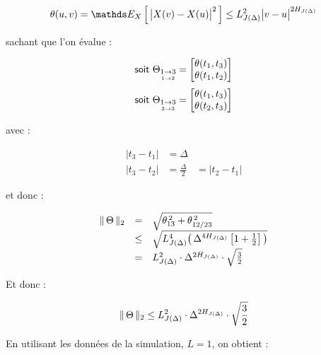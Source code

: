 \begin{equation}
	\theta(u,v) = \esperanceloi X { \bigl| X(v) - X(u) \bigr|^2 } \leq L_{J(\Delta)}^2 \bigl| v - u \bigr|^{2 H_{J(\Delta)}}
\end{equation}

sachant que l'on évalue :

\begin{equation}
	\textsf{soit }
	\Theta_{\underset{1 \rightarrow 2}{1 \rightarrow 3}} = \begin{bmatrix} \theta(t_1, t_3) \\ \theta(t_1, t_2) \end{bmatrix}
\end{equation}
\begin{equation}
	\textsf{soit }
	\Theta_{\underset{2 \rightarrow 3}{1 \rightarrow 3}} = \begin{bmatrix} \theta(t_1, t_3) \\ \theta(t_2, t_3) \end{bmatrix}
\end{equation}


avec :

\begin{equation}
	\begin{array}{ccc}
		|t_3 - t_1| & = \Delta
		\\
		|t_3 - t_2| & = \frac \Delta 2 & = |t_2 - t_1|
	\end{array}
\end{equation}

et donc :

\begin{equation}
	\displaystyle
	\begin{array}{rclr}
		\lVert \, \Theta \, \rVert _ {2} & =    & \sqrt{\theta_{13}^{\,2} + \theta_{12/23}^{\, 2}}
		\\
		                & \leq & \sqrt{ L_{J(\Delta)}^4 \bigl( \, \Delta^{4 H_{J(\Delta)}} \left[ 1 + \frac 1 2 \right]  \, \bigr) }
		\\
		                & =    & L_{J(\Delta)}^2 \cdot \Delta^{2H_{J(\Delta)}} \cdot \sqrt{\frac 3 2}
	\end{array}
\end{equation}

Et donc :

\begin{equation*}
	\lVert \, \Theta \, \rVert _ {2} \leq L_{J(\Delta)}^2 \cdot \Delta^{2H_{J(\Delta)}} \cdot \sqrt{\frac 3 2}
\end{equation*}

En utilisant les données de la simulation, $L = 1$, on obtient :

